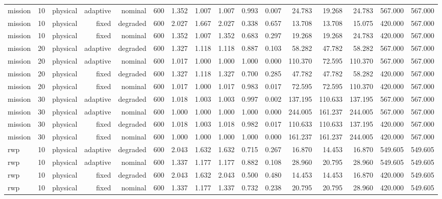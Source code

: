 \begin{tabular}{lrrrrrrrrrrrrrrr}
mission & 10 & physical & adaptive & nominal & 600 & 1.352 & 1.007 & 1.007 & 0.993 & 0.007 & 24.783 & 19.268 & 24.783 & 567.000 & 567.000 \\
mission & 10 & physical & fixed & degraded & 600 & 2.027 & 1.667 & 2.027 & 0.338 & 0.657 & 13.708 & 13.708 & 15.075 & 420.000 & 567.000 \\
mission & 10 & physical & fixed & nominal & 600 & 1.352 & 1.007 & 1.352 & 0.683 & 0.297 & 19.268 & 19.268 & 24.783 & 420.000 & 567.000 \\
mission & 20 & physical & adaptive & degraded & 600 & 1.327 & 1.118 & 1.118 & 0.887 & 0.103 & 58.282 & 47.782 & 58.282 & 567.000 & 567.000 \\
mission & 20 & physical & adaptive & nominal & 600 & 1.017 & 1.000 & 1.000 & 1.000 & 0.000 & 110.370 & 72.595 & 110.370 & 567.000 & 567.000 \\
mission & 20 & physical & fixed & degraded & 600 & 1.327 & 1.118 & 1.327 & 0.700 & 0.285 & 47.782 & 47.782 & 58.282 & 420.000 & 567.000 \\
mission & 20 & physical & fixed & nominal & 600 & 1.017 & 1.000 & 1.017 & 0.983 & 0.017 & 72.595 & 72.595 & 110.370 & 420.000 & 567.000 \\
mission & 30 & physical & adaptive & degraded & 600 & 1.018 & 1.003 & 1.003 & 0.997 & 0.002 & 137.195 & 110.633 & 137.195 & 567.000 & 567.000 \\
mission & 30 & physical & adaptive & nominal & 600 & 1.000 & 1.000 & 1.000 & 1.000 & 0.000 & 244.005 & 161.237 & 244.005 & 567.000 & 567.000 \\
mission & 30 & physical & fixed & degraded & 600 & 1.018 & 1.003 & 1.018 & 0.982 & 0.017 & 110.633 & 110.633 & 137.195 & 420.000 & 567.000 \\
mission & 30 & physical & fixed & nominal & 600 & 1.000 & 1.000 & 1.000 & 1.000 & 0.000 & 161.237 & 161.237 & 244.005 & 420.000 & 567.000 \\
rwp & 10 & physical & adaptive & degraded & 600 & 2.043 & 1.632 & 1.632 & 0.715 & 0.267 & 16.870 & 14.453 & 16.870 & 549.605 & 549.605 \\
rwp & 10 & physical & adaptive & nominal & 600 & 1.337 & 1.177 & 1.177 & 0.882 & 0.108 & 28.960 & 20.795 & 28.960 & 549.605 & 549.605 \\
rwp & 10 & physical & fixed & degraded & 600 & 2.043 & 1.632 & 2.043 & 0.500 & 0.480 & 14.453 & 14.453 & 16.870 & 420.000 & 549.605 \\
rwp & 10 & physical & fixed & nominal & 600 & 1.337 & 1.177 & 1.337 & 0.732 & 0.238 & 20.795 & 20.795 & 28.960 & 420.000 & 549.605 \\

\end{tabular}
